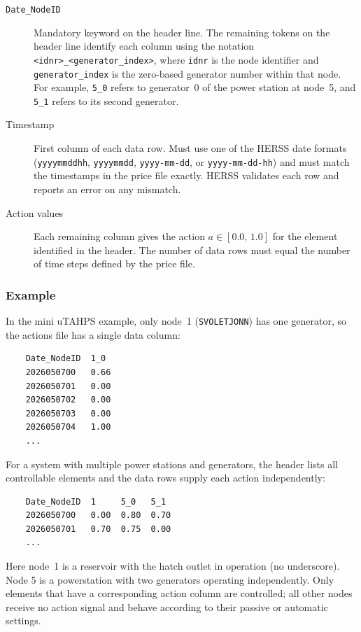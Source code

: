 \documentclass[a4paper, 12pt]{report}
\begin{document}
	\begin{description}
	\item[\texttt{Date\_NodeID}] Mandatory keyword on the header line. The remaining
	tokens on the header line identify each column using the notation
	\texttt{<idnr>\_<generator\_index>}, where \texttt{idnr} is the node identifier
	and \texttt{generator\_index} is the zero-based generator number within that
	node. For example, \texttt{5\_0} refers to generator~0 of the power station at
	node~5, and \texttt{5\_1} refers to its second generator.
	
	\item[Timestamp] First column of each data row. Must use one of the HERSS date
	formats (\texttt{yyyymmddhh}, \texttt{yyyymmdd}, \texttt{yyyy-mm-dd}, or
	\texttt{yyyy-mm-dd-hh}) and must match the timestamps in the price file exactly.
	HERSS validates each row and reports an error on any mismatch.
	
	\item[Action values] Each remaining column gives the action $a \in [0.0,\, 1.0]$
	for the element identified in the header. The number of data rows must equal
	the number of time steps defined by the price file.
	\end{description}

	\subsubsection{Example}

	In the mini uTAHPS example, only node~1 (\texttt{SVOLETJONN}) has one generator, so the
	actions file has a single data column:

	\begin{verbatim}
	Date_NodeID  1_0
	2026050700   0.66
	2026050701   0.00
	2026050702   0.00
	2026050703   0.00
	2026050704   1.00
	...
	\end{verbatim}

	For a system with multiple power stations and generators, the header lists all controllable
	elements and the data rows supply each action independently:

	\begin{verbatim}
	Date_NodeID  1     5_0   5_1
	2026050700   0.00  0.80  0.70
	2026050701   0.70  0.75  0.00
	...
	\end{verbatim}

	Here node~1 is a reservoir with the hatch outlet in operation (no underscore). Node 5 is a powerstation with two generators operating independently. Only elements that have a corresponding action column are controlled; all other nodes receive no action signal and behave according to their passive or automatic settings.
\end{document}
